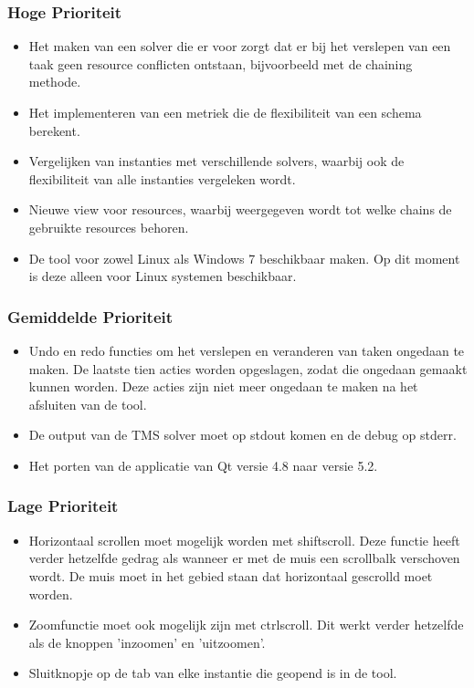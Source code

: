 \subsubsection*{Hoge Prioriteit}
\begin{itemize}
	\item Het maken van een solver die er voor zorgt dat er bij het verslepen van een taak geen resource conflicten ontstaan, bijvoorbeeld met de chaining methode.
	\item Het implementeren van een metriek die de flexibiliteit van een schema berekent.
	\item Vergelijken van instanties met verschillende solvers, waarbij ook de flexibiliteit van alle instanties vergeleken wordt.
	\item Nieuwe view voor resources, waarbij weergegeven wordt tot welke chains de gebruikte resources behoren.
	\item De tool voor zowel Linux als Windows 7 beschikbaar maken. Op dit moment is deze alleen voor Linux systemen beschikbaar.
\end{itemize}

\subsubsection*{Gemiddelde Prioriteit}
\begin{itemize}
	\item Undo en redo functies om het verslepen en veranderen van taken ongedaan te maken. De laatste tien acties worden opgeslagen, zodat die ongedaan gemaakt kunnen worden. Deze acties zijn niet meer ongedaan te maken na het afsluiten van de tool.
	\item De output van de TMS solver moet op stdout komen en de debug op stderr.
	\item Het porten van de applicatie van Qt versie 4.8 naar versie 5.2.
\end{itemize}

\subsubsection*{Lage Prioriteit}
\begin{itemize}
	\item Horizontaal scrollen moet mogelijk worden met shift\plus scroll. Deze functie heeft verder hetzelfde gedrag als wanneer er met de muis een scrollbalk verschoven wordt. De muis moet in het gebied staan dat horizontaal gescrolld moet worden. 
	\item Zoomfunctie moet ook mogelijk zijn met ctrl\plus scroll. Dit werkt verder hetzelfde als de knoppen 'inzoomen' en 'uitzoomen'.
	\item Sluitknopje op de tab van elke instantie die geopend is in de tool.
\end{itemize}

